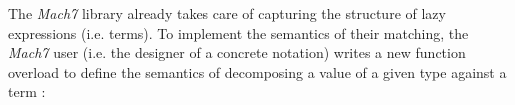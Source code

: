 %




\noindent
The \emph{Mach7} library already takes care of capturing the structure of lazy expressions 
(i.e. terms). To implement the semantics of their matching, the \emph{Mach7} user (i.e. the designer 
of a concrete notation) writes a new function overload to define the semantics of decomposing a value of a given 
type  against a term :


